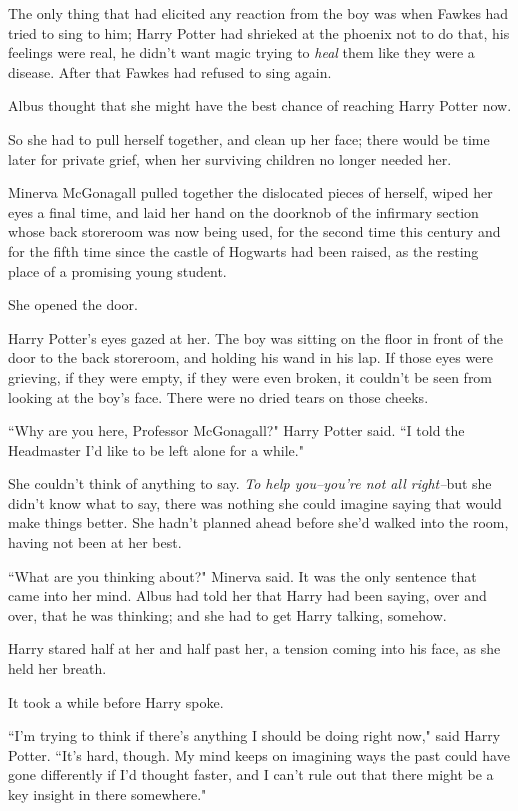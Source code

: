 The only thing that had elicited any reaction from the boy was when Fawkes had tried to sing to him; Harry Potter had shrieked at the phoenix not to do that, his feelings were real, he didn't want magic trying to \emph{heal} them like they were a disease. After that Fawkes had refused to sing again.

Albus thought that she might have the best chance of reaching Harry Potter now.

So she had to pull herself together, and clean up her face; there would be time later for private grief, when her surviving children no longer needed her.

Minerva McGonagall pulled together the dislocated pieces of herself, wiped her eyes a final time, and laid her hand on the doorknob of the infirmary section whose back storeroom was now being used, for the second time this century and for the fifth time since the castle of Hogwarts had been raised, as the resting place of a promising young student.

She opened the door.

Harry Potter's eyes gazed at her. The boy was sitting on the floor in front of the door to the back storeroom, and holding his wand in his lap. If those eyes were grieving, if they were empty, if they were even broken, it couldn't be seen from looking at the boy's face. There were no dried tears on those cheeks.

``Why are you here, Professor McGonagall?" Harry Potter said. ``I told the Headmaster I'd like to be left alone for a while."

She couldn't think of anything to say. \emph{To help you\---you're not all right\---}but she didn't know what to say, there was nothing she could imagine saying that would make things better. She hadn't planned ahead before she'd walked into the room, having not been at her best.

``What are you thinking about?" Minerva said. It was the only sentence that came into her mind. Albus had told her that Harry had been saying, over and over, that he was thinking; and she had to get Harry talking, somehow.

Harry stared half at her and half past her, a tension coming into his face, as she held her breath.

It took a while before Harry spoke.

``I'm trying to think if there's anything I should be doing right now," said Harry Potter. ``It's hard, though. My mind keeps on imagining ways the past could have gone differently if I'd thought faster, and I can't rule out that there might be a key insight in there somewhere."

